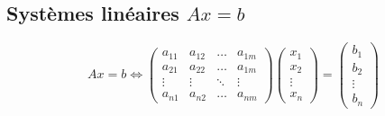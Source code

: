\subsection{Systèmes linéaires $Ax=b$}
\[
    Ax=b
    \Leftrightarrow
    \begin{pmatrix}
        a_{11} & a_{12} & \dots & a_{1m} \\
        a_{21} & a_{22} & \dots & a_{1m} \\
        \vdots & \vdots & \ddots & \vdots \\
        a_{n1} & a_{n2} & \hdots & a_{nm}
    \end{pmatrix}
    \begin{pmatrix}
        x_1\\
        x_2\\
        \vdots \\
        x_n
    \end{pmatrix}
    =
    \begin{pmatrix}
        b_1\\b_2\\\vdots\\b_n
    \end{pmatrix}
\]
